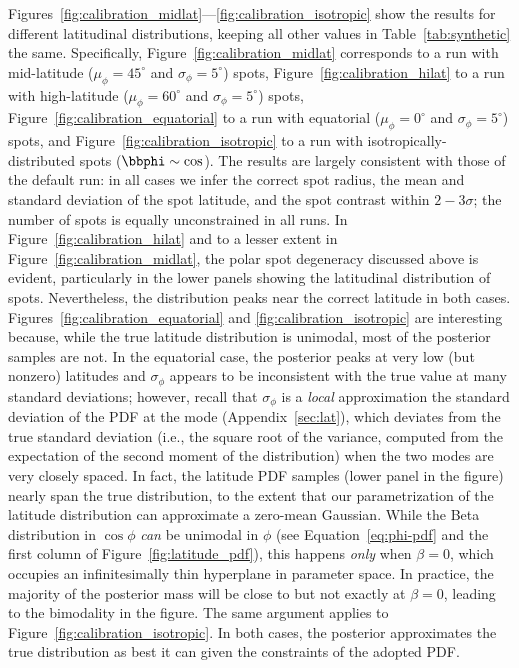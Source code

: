\documentclass[modern,linenumbers]{aastex62}
\begin{document}
Figures~\ref{fig:calibration_midlat}---\ref{fig:calibration_isotropic}
show the results for different latitudinal
distributions, keeping all other values in Table~\ref{tab:synthetic} the same.
Specifically, Figure~\ref{fig:calibration_midlat} corresponds to a run
with mid-latitude ($\mu_\phi = 45^\circ$ and $\sigma_\phi = 5^\circ$) spots,
Figure~\ref{fig:calibration_hilat} to a run with high-latitude
($\mu_\phi = 60^\circ$ and $\sigma_\phi = 5^\circ$) spots,
Figure~\ref{fig:calibration_equatorial} to a run with equatorial
($\mu_\phi = 0^\circ$ and $\sigma_\phi = 5^\circ$) spots, and
Figure~\ref{fig:calibration_isotropic} to a run with isotropically-distributed
spots ($\bbphi \sim \cos$).
The results are largely consistent with those of the default run: in all
cases we infer the correct spot radius, the mean and standard deviation of
the spot latitude, and the spot contrast within $2-3\sigma$; the number of
spots is equally unconstrained in all runs.
In Figure~\ref{fig:calibration_hilat} and to a lesser extent in
Figure~\ref{fig:calibration_midlat}, the polar spot degeneracy discussed
above is evident, particularly in the lower panels showing the latitudinal
distribution of spots. Nevertheless, the distribution peaks near the correct
latitude in both cases.
Figures~\ref{fig:calibration_equatorial} and \ref{fig:calibration_isotropic}
are interesting because, while the true latitude distribution is unimodal,
most of the posterior samples are not. In the equatorial case, the posterior
peaks at very low (but nonzero) latitudes and $\sigma_\phi$ appears to be
inconsistent with the true value at many standard deviations; however, recall
that $\sigma_\phi$ is a \emph{local} approximation the standard deviation of the
PDF at the mode (Appendix~\ref{sec:lat}), which deviates from the true
standard deviation (i.e., the
square root of the variance, computed from the expectation of the second
moment of the distribution) when the two modes are very closely spaced.
In fact, the latitude PDF samples (lower panel in the figure) nearly span
the true distribution, to the extent that our parametrization of the
latitude distribution can approximate a zero-mean Gaussian. While the Beta
distribution in $\cos\phi$ \emph{can} be unimodal in $\phi$ (see
Equation~\ref{eq:phi-pdf} and the first
column of Figure~\ref{fig:latitude_pdf}), this happens \emph{only} when
$\beta = 0$, which occupies an infinitesimally thin hyperplane in
parameter space. In practice, the majority of the posterior mass will be close
to but not exactly at $\beta = 0$, leading to the bimodality in the figure.
The same argument applies to Figure~\ref{fig:calibration_isotropic}.
In both cases, the posterior approximates the true distribution as best it
can given the constraints of the adopted PDF.
\end{document}
